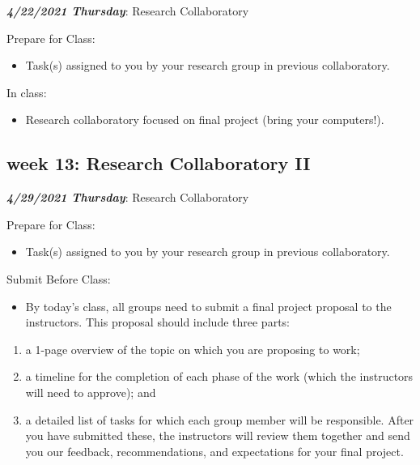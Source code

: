 \documentclass[
]{book}
\providecommand{\tightlist}{%
  \setlength{\itemsep}{0pt}\setlength{\parskip}{0pt}}
\begin{document}
\textbf{\emph{4/22/2021 Thursday}}: Research Collaboratory

Prepare for Class:

\begin{itemize}
\tightlist
\item
  Task(s) assigned to you by your research group in previous collaboratory.
\end{itemize}

In class:

\begin{itemize}
\tightlist
\item
  Research collaboratory focused on final project (bring your computers!).
\end{itemize}

\hypertarget{week-13-research-collaboratory-ii}{%
\subsection{week 13: Research Collaboratory II}\label{week-13-research-collaboratory-ii}}

\textbf{\emph{4/29/2021 Thursday}}: Research Collaboratory

Prepare for Class:

\begin{itemize}
\tightlist
\item
  Task(s) assigned to you by your research group in previous collaboratory.
\end{itemize}

Submit Before Class:

\begin{itemize}
\tightlist
\item
  By today's class, all groups need to submit a final project proposal to the instructors. This proposal should include three parts:
\end{itemize}

\begin{enumerate}
\def\labelenumi{(\arabic{enumi})}
\tightlist
\item
  a 1-page overview of the topic on which you are proposing to work;
\item
  a timeline for the completion of each phase of the work (which the instructors will need to approve); and
\item
  a detailed list of tasks for which each group member will be responsible. After you have submitted these, the instructors will review them together and send you our feedback, recommendations, and expectations for your final project.
\end{enumerate}
\end{document}
